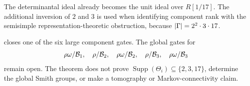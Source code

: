 \begin{remark}
The determinantal ideal already becomes the unit ideal over \(R[1/17]\).
The additional inversion of \(2\) and \(3\) is used when identifying
component rank with the semisimple representation-theoretic obstruction,
because \(|\Gamma|=2^2\cdot3\cdot17\).
\end{remark}

\begin{remark}
\label{rem:global-rho-boundary}
 closes one of the six large component gates.  The
global gates for
\[
 \rho\omega/\mathcal B_1,\quad
 \rho/\mathcal B_2,\quad
 \rho\omega/\mathcal B_2,\quad
 \rho/\mathcal B_3,\quad
 \rho\omega/\mathcal B_3
\]
remain open.  The theorem does not prove
\(\operatorname{Supp}(\Theta_i)\subseteq\{2,3,17\}\), determine the
global Smith groups, or make a tomography or Markov-connectivity claim.
\end{remark}
